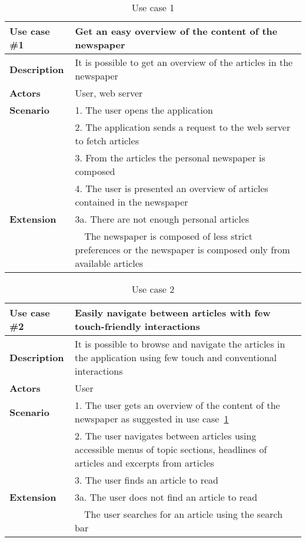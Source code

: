 \begin{table}[h!tp]
\myfloatalign
	\begin{tabular}{p{}|p{}} \toprule 
		\textbf{Use case \#1} & Get an easy overview of the content of the newspaper\\ \midrule
		\textbf{Description} & It is possible to get an overview of the articles in the newspaper\\ \midrule
		\textbf{Actors} & User, web server\\ \midrule
		\textbf{Scenario} 	& 1. The user opens the application\\
								& 2. The application sends a request to the web server to fetch articles\\
								& 3. From the articles the personal newspaper is composed\\
								& 4. The user is presented an overview of articles contained in the newspaper\\ \midrule
		\textbf{Extension}	& 3a. There are not enough personal articles\\
										& \ \ The newspaper is composed of less strict preferences or the newspaper is composed only from available articles\\
										 \bottomrule
	\end{tabular}
\caption{Use case 1}
\label{tab:use_case1}
\end{table}

\begin{table}[h!tp]
\myfloatalign
	\begin{tabular}{p{}|p{}} \toprule 
		\textbf{Use case \#2} & Easily navigate between articles with few touch-friendly interactions\\ \midrule
		\textbf{Description} & It is possible to browse and navigate the articles in the application using few touch and conventional interactions\\ \midrule
		\textbf{Actors} & User\\ \midrule
		\textbf{Scenario} 	& 1. The user gets an overview of the content of the newspaper as suggested in use case~\ref{tab:use_case1}\\
								& 2. The user navigates between articles using accessible menus of topic sections, headlines of articles and excerpts from articles\\
								& 3. The user finds an article to read\\ \midrule
		\textbf{Extension}	& 3a. The user does not find an article to read\\
										& \ \ The user searches for an article using the search bar\\
										 \bottomrule
	\end{tabular}
\caption{Use case 2}
\label{tab:use_case2}
\end{table}

